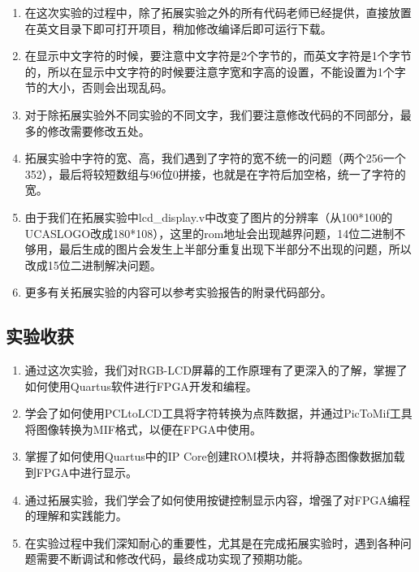\documentclass[UTF8]{article}
\theoremstyle{MyLineTheoremStyle} %
\theoremstyle{MyBlockTheoremStyle} %
\theoremstyle{MySubsubsectionStyle} %
\begin{document}
\begin{enumerate}
\item 在这次实验的过程中，除了拓展实验之外的所有代码老师已经提供，直接放置在英文目录下即可打开项目，稍加修改编译后即可运行下载。
\item 在显示中文字符的时候，要注意中文字符是2个字节的，而英文字符是1个字节的，所以在显示中文字符的时候要注意字宽和字高的设置，不能设置为1个字节的大小，否则会出现乱码。
\item 对于除拓展实验外不同实验的不同文字，我们要注意修改代码的不同部分，最多的修改需要修改五处。
\item 拓展实验中字符的宽、高，我们遇到了字符的宽不统一的问题（两个256一个352），最后将较短数组与96位0拼接，也就是在字符后加空格，统一了字符的宽。
\item 由于我们在拓展实验中lcd\_display.v中改变了图片的分辨率（从100*100的UCASLOGO改成180*108），这里的rom地址会出现越界问题，14位二进制不够用，最后生成的图片会发生上半部分重复出现下半部分不出现的问题，所以改成15位二进制解决问题。
\item 更多有关拓展实验的内容可以参考实验报告的附录代码部分。
\end{enumerate}

\subsection{实验收获}
\begin{enumerate}
\item 通过这次实验，我们对RGB-LCD屏幕的工作原理有了更深入的了解，掌握了如何使用Quartus软件进行FPGA开发和编程。
\item 学会了如何使用PCLtoLCD工具将字符转换为点阵数据，并通过PicToMif工具将图像转换为MIF格式，以便在FPGA中使用。
\item 掌握了如何使用Quartus中的IP Core创建ROM模块，并将静态图像数据加载到FPGA中进行显示。
\item 通过拓展实验，我们学会了如何使用按键控制显示内容，增强了对FPGA编程的理解和实践能力。
\item 在实验过程中我们深知耐心的重要性，尤其是在完成拓展实验时，遇到各种问题需要不断调试和修改代码，最终成功实现了预期功能。
\end{enumerate}

\cleardoublepage
\end{document}
